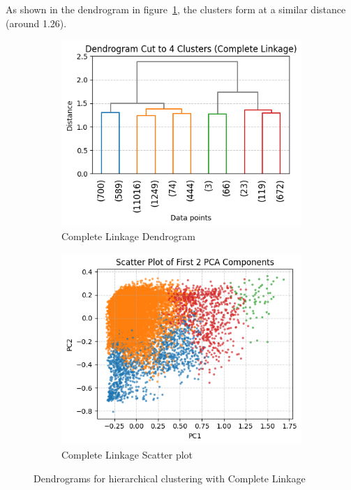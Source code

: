 As shown in the dendrogram in figure~\ref{fig:dendrogram_complete}, the clusters form at a similar distance
(around 1.26).
\begin{figure}[H]
    \centering
    \begin{subfigure}[b]{0.49\textwidth}
        \centering
        \includegraphics[width=\textwidth]{plots/dendrogram_complete.png}
        \caption{Complete Linkage Dendrogram}
        \label{fig:dendrogram_complete}
    \end{subfigure}
    \begin{subfigure}[b]{0.49\textwidth}
        \centering
        \includegraphics[width=\textwidth]{plots/scatter_complete.png}
        \caption{Complete Linkage Scatter plot}
        \label{fig:pairplot_ward_5}
    \end{subfigure}
    \caption{Dendrograms for hierarchical clustering with Complete Linkage}
    \label{fig:dendrograms_complete}
\end{figure}



